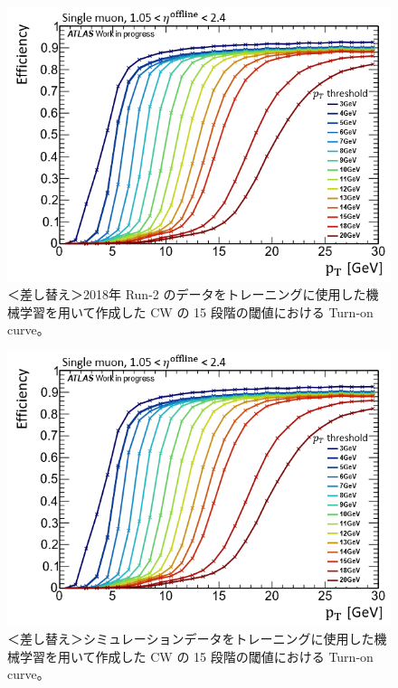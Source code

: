 \begin{figure}[tb]
  \centering
  \includegraphics[clip, width=12cm]{fig/4/v07_15_Eff.png}
  \caption{＜差し替え＞2018年 Run-2 のデータをトレーニングに使用した機械学習を用いて作成した CW の 15 段階の閾値における Turn-on curve。}
  \label{fig:15Eff_CW_Data}
\end{figure}

\begin{figure}[tb]
  \centering
  \includegraphics[clip, width=12cm]{fig/4/v07_15_Eff.png}
  \caption{＜差し替え＞シミュレーションデータをトレーニングに使用した機械学習を用いて作成した CW の 15 段階の閾値における Turn-on curve。}
  \label{fig:15Eff_CW_Simu}
\end{figure}

